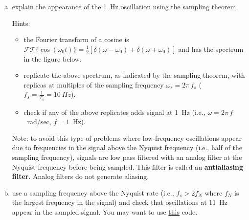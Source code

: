\documentclass[12pt]{article}
\begin{document}
\begin{enumerate}
\begin{figure}
\begin{center}
            \end{center}
            \label{fig:undersampledLFP}
        \end{figure}

        \begin{enumerate}[(a)]

            \item explain the appearance of the 1~Hz oscillation using the
                sampling theorem.

                Hints:

                \begin{itemize}

                    \item the Fourier transform of a cosine is
                        $\mathcal{FT}\{\cos(\omega_0 t)\}=\frac{1}{2}[\delta(\omega-\omega_0)+\delta(\omega+\omega_0)]$
                        and has the spectrum in the figure below.
                        

                    \item replicate the above spectrum, as indicated
                        by the sampling theorem, with replicas at multiples
                        of the sampling frequency $\omega_s=2\pi\,f_s$
                        ($f_s=\frac{1}{T_s}=10~Hz$).

                    \item check if any of the above replicates adds signal at
                        1~Hz (i.e., $\omega=2\pi\,f$~rad/sec, $f=1$~Hz).
                \end{itemize}

                Note: to avoid this type of problems where low-frequency
                oscillations appear due to frequencies in the signal above the
                Nyquist frequency (i.e., half of the sampling frequency),
                signals are low pass filtered with an analog filter at the
                Nyquist frequency before being sampled. This filter is called
                an \textbf{antialiasing filter}. Analog filters do not
                generate aliasing.

            \item use a sampling frequency above the Nyquist rate (i.e.,
                $f_s>2f_N$ where $f_N$ is the largest frequency in the signal)
                and check that oscillations at 11~Hz appear in the sampled
                signal. You may want to use 
                \href{https://github.com/joacorapela/neuroinformatics24/blob/master/worksheets/02_LFPs_spectralAnalysis/code/doExUndersampledLFP.py}{this}
                code.


\end{enumerate}
\end{enumerate}
\end{document}

